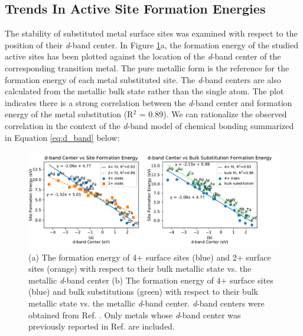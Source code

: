 
\subsection{Trends In Active Site Formation Energies}

The stability of substituted metal surface sites was examined with respect to the position of their \textit{d}-band center. In Figure \ref{fig:d_band}a, the formation energy of the studied active sites has been plotted against the location of the \textit{d}-band center of the corresponding transition metal. The pure metallic form is the reference for the formation energy of each metal substituted site. The \textit{d}-band centers are also calculated from the metallic bulk state rather than the single atom. The plot indicates there is a strong correlation between the \textit{d}-band center and formation energy of the metal substitution (R$^2$ = 0.89). We can rationalize the observed correlation in the context of the \textit{d}-band model of chemical bonding \cite{Hammer_1995, Nilsson_2008} summarized in Equation \ref{eq:d_band} below:
\begin{figure}
    \centering
    \includegraphics[width=0.9\linewidth]{Images/d_band_vs_formation.pdf}
    \caption{(a) The formation energy of 4+ surface sites (blue) and 2+ surface sites (orange) with respect to their bulk metallic state vs. the metallic \textit{d}-band center (b) The formation energy of 4+ surface sites (blue) and bulk substitutions (green) with respect to their bulk metallic state vs. the metallic \textit{d}-band center. \textit{d}-band centers were obtained from Ref. . Only metals whose \textit{d}-band center was previously reported in Ref.  are included.}
    \label{fig:d_band}
\end{figure}

